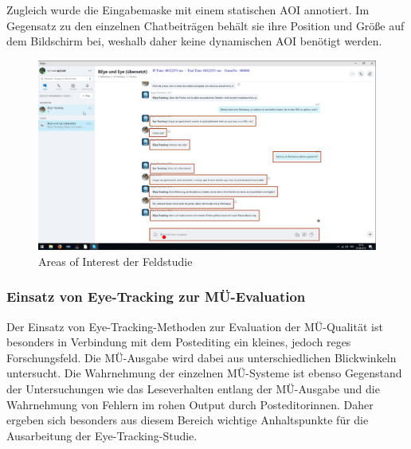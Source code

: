 Zugleich wurde die Eingabemaske mit einem statischen AOI annotiert. Im Gegensatz zu den einzelnen Chatbeiträgen behält sie ihre Position und Größe auf dem Bildschirm bei, weshalb daher keine dynamischen AOI benötigt werden.



\begin{figure}
    \includegraphics[width=\textwidth]{Figures/EyeTracking/Playback_Image_TN12_TN12_Trial_1.png}
	\caption{Areas of Interest der Feldstudie\label{K5:fig:AOI-Feldstudie}}
\end{figure}



%
%
\subsubsection{Einsatz von Eye-Tracking zur MÜ-Evaluation}
\label{K5:subsec:EyeTracking-MüEva}


Der Einsatz von Eye-Tracking-Methoden zur Evaluation der MÜ-Qualität ist besonders in Verbindung mit dem Postediting ein kleines, jedoch reges Forschungsfeld. Die MÜ-Ausgabe wird dabei aus unterschiedlichen Blickwinkeln untersucht. Die Wahrnehmung der einzelnen MÜ-Systeme ist ebenso Gegenstand der Untersuchungen wie das Leseverhalten entlang der MÜ-Ausgabe und die Wahrnehmung von Fehlern im rohen Output durch Posteditor{\textperiodcentered}innen. Daher ergeben sich besonders aus diesem Bereich wichtige Anhaltspunkte für die Ausarbeitung der Eye-Tracking-Studie.

